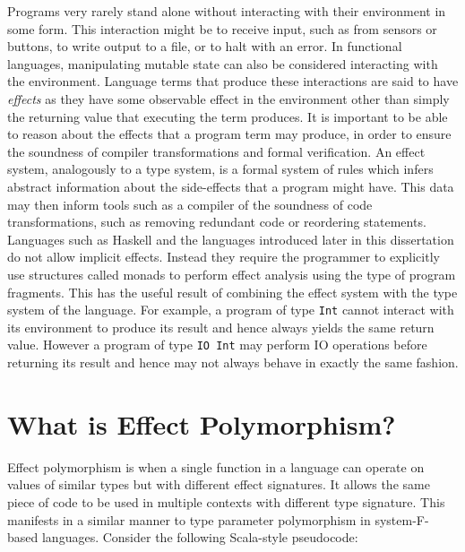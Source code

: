 \documentclass{Report}
\begin{document}
Programs very rarely stand alone without interacting with their environment in some form. This interaction might be to receive input, such as from sensors or buttons, to write output to a file, or to halt with an error. In functional languages, manipulating mutable state can also be considered interacting with the environment. Language terms that produce these interactions are said to have \textit{effects} as they have some observable effect in the environment other than simply the returning value that executing the term produces. It is important to be able to reason about the effects that a program term may produce, in order to ensure the soundness of compiler transformations and formal verification. An effect system, analogously to a type system, is a formal system of rules which infers abstract information about the side-effects that a program might have. This data may then inform tools such as a compiler of the soundness of code transformations, such as removing redundant code or reordering statements. Languages such as Haskell and the languages introduced later in this dissertation do not allow implicit effects. Instead they require the programmer to explicitly use structures called monads \cite{MoggiMonads} to perform effect analysis using the type of program fragments. This has the useful result of combining the effect system with the type system of the language. For example, a program of type \texttt{Int} cannot interact with its environment to produce its result and hence always yields the same return value. However a program of type \texttt{IO Int} may perform IO operations before returning its result and hence may not always behave in exactly the same fashion.

\section{What is Effect Polymorphism?}


Effect polymorphism is when a single function in a language can operate on values of similar types but with different effect signatures. It allows the same piece of code to be used in multiple contexts with different type signature. This manifests in a similar manner to type parameter polymorphism in system-F-based languages. Consider the following Scala-style pseudocode:
\renewcommand\o[1]{\textcolor{orange}{#1}}
\newcommand\bl[1]{\textcolor{blue}{#1}}
\newcommand\gr[1]{\textcolor{DarkGreen}{#1}}
\newcommand\pl[1]{\textcolor{purple}{#1}}
\newcommand\cy[1]{\textcolor{cyan}{#1}}
\newcommand\red[1]{\textcolor{red}{#1}}
\end{document}

